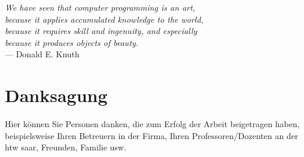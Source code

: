 
\begin{flushright}{\slshape
        We have seen that computer programming is an art, \\
        because it applies accumulated knowledge to the world, \\
        because it requires skill and ingenuity, and especially \\
        because it produces objects of beauty.} \\ \medskip
    --- Donald E. Knuth \cite{knuth:1974}
\end{flushright}

\bigskip

\begingroup
\let\clearpage\relax
\let\cleardoublepage\relax
\let\cleardoublepage\relax
\chapter*{Danksagung}
Hier können Sie Personen danken, die zum Erfolg der Arbeit beigetragen haben, beispielsweise Ihren Betreuern in der Firma, Ihren Professoren/Dozenten an der htw saar, Freunden, Familie usw.




\endgroup

